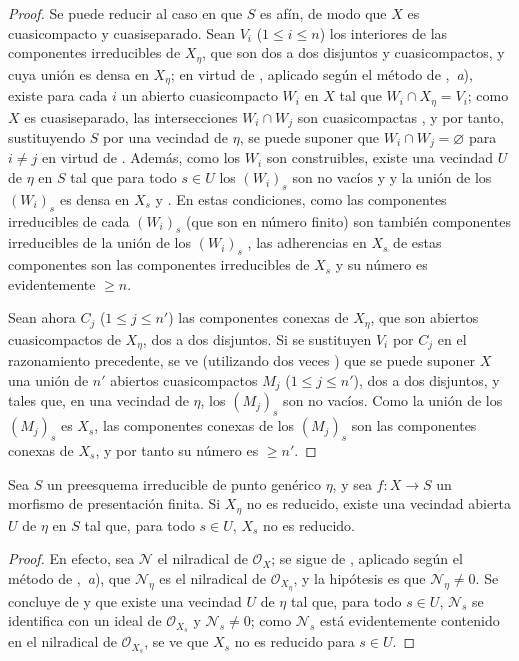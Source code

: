 \begin{proof}
Se puede reducir al caso en que $S$ es afín, de modo que $X$ es cuasicompacto y cuasiseparado.
Sean $V_i$ ($1\leqslant i\leqslant n$) los interiores de las componentes irreducibles de $X_\eta$, que son dos a dos disjuntos y cuasicompactos, y cuya unión es densa en $X_\eta$; en virtud de , aplicado según el método de ,~\emph{a}), existe para cada $i$ un abierto cuasicompacto $W_i$ en $X$ tal que $W_i\cap X_\eta=V_i$; como $X$ es cuasiseparado, las intersecciones $W_i\cap W_j$ son cuasicompactas , y por tanto, sustituyendo $S$ por una vecindad de $\eta$, se puede suponer que $W_i\cap W_j=\varnothing$ para $i\neq j$ en virtud de .
Además, como los $W_i$ son construibles, existe una vecindad $U$ de $\eta$ en $S$ tal que para todo $s\in U$ los $(W_i)_s$ son no vacíos  y  y la unión de los $(W_i)_s$ es densa en $X_s$  y .
En estas condiciones, como las componentes irreducibles de cada $(W_i)_s$ (que son en número finito) son también componentes irreducibles de la unión de los $(W_i)_s$ , las adherencias en $X_s$ de estas componentes son las componentes irreducibles de $X_s$  y su número es evidentemente $\geqslant n$.

Sean ahora $C_j$ ($1\leqslant j\leqslant n'$) las componentes conexas de $X_\eta$, que son abiertos cuasicompactos de $X_\eta$, dos a dos disjuntos.
Si se sustituyen $V_i$ por $C_j$ en el razonamiento precedente, se ve (utilizando dos veces ) que se puede suponer $X$ una unión de $n'$ abiertos cuasicompactos $M_j$ ($1\leqslant j\leqslant n'$), dos a dos disjuntos, y tales que, en una vecindad de $\eta$, los $(M_j)_s$ son no vacíos.
Como la unión de los $(M_j)_s$ es $X_s$, las componentes conexas de los $(M_j)_s$ son las componentes conexas de $X_s$, y por tanto su número es $\geqslant n'$.
\end{proof}


\begin{lemma}[9.7.2]
\label{IV.9.7.2}
Sea $S$ un preesquema irreducible de punto genérico $\eta$, y sea $f:X\to S$ un morfismo de presentación finita.
Si $X_\eta$ no es reducido, existe una vecindad abierta $U$ de $\eta$ en $S$ tal que, para todo $s\in U$, $X_s$ no es reducido.
\end{lemma}

\begin{proof}
En efecto, sea $\mathcal N$ el nilradical de $\mathcal O_X$; se sigue de , aplicado según el método de ,~\emph{a}), que $\mathcal N_\eta$ es el nilradical de $\mathcal O_{X_\eta}$, y la hipótesis es que $\mathcal N_\eta\neq0$.
Se concluye de  y  que existe una vecindad $U$ de $\eta$ tal que, para todo $s\in U$, $\mathcal N_s$ se identifica con un ideal de $\mathcal O_{X_s}$ y $\mathcal N_s\neq0$; como $\mathcal N_s$ está evidentemente contenido en el nilradical de $\mathcal O_{X_s}$, se ve que $X_s$ no es reducido para $s\in U$.
\end{proof}

